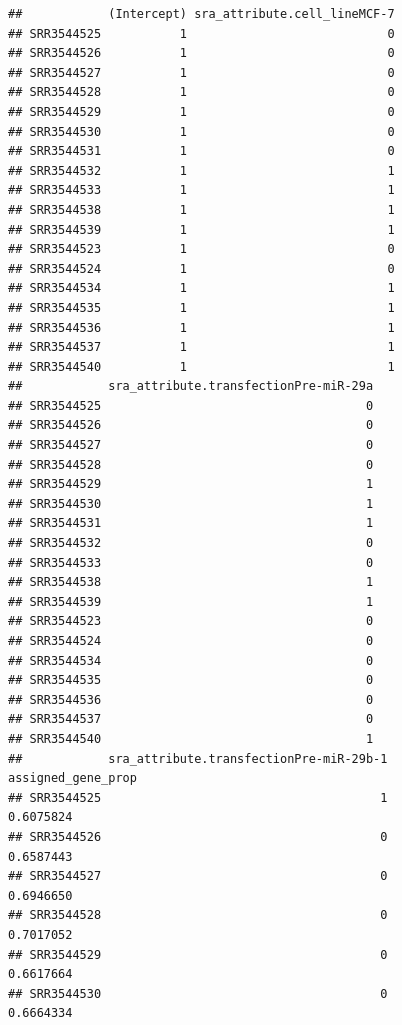 \documentclass[
]{article}
\begin{document}
\begin{verbatim}
##            (Intercept) sra_attribute.cell_lineMCF-7
## SRR3544525           1                            0
## SRR3544526           1                            0
## SRR3544527           1                            0
## SRR3544528           1                            0
## SRR3544529           1                            0
## SRR3544530           1                            0
## SRR3544531           1                            0
## SRR3544532           1                            1
## SRR3544533           1                            1
## SRR3544538           1                            1
## SRR3544539           1                            1
## SRR3544523           1                            0
## SRR3544524           1                            0
## SRR3544534           1                            1
## SRR3544535           1                            1
## SRR3544536           1                            1
## SRR3544537           1                            1
## SRR3544540           1                            1
##            sra_attribute.transfectionPre-miR-29a
## SRR3544525                                     0
## SRR3544526                                     0
## SRR3544527                                     0
## SRR3544528                                     0
## SRR3544529                                     1
## SRR3544530                                     1
## SRR3544531                                     1
## SRR3544532                                     0
## SRR3544533                                     0
## SRR3544538                                     1
## SRR3544539                                     1
## SRR3544523                                     0
## SRR3544524                                     0
## SRR3544534                                     0
## SRR3544535                                     0
## SRR3544536                                     0
## SRR3544537                                     0
## SRR3544540                                     1
##            sra_attribute.transfectionPre-miR-29b-1 assigned_gene_prop
## SRR3544525                                       1          0.6075824
## SRR3544526                                       0          0.6587443
## SRR3544527                                       0          0.6946650
## SRR3544528                                       0          0.7017052
## SRR3544529                                       0          0.6617664
## SRR3544530                                       0          0.6664334

\end{verbatim}
\end{document}

